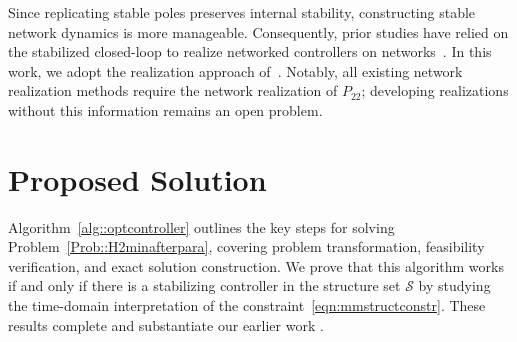 

\begin{rem}
Since replicating stable poles preserves internal stability, constructing stable network dynamics is more manageable. Consequently, prior studies have relied on the stabilized closed-loop to realize networked controllers on networks~\cite{wang2019SLS, Gulnihal2018thesis, Rantzer2019Netimpl}. In this work, we adopt the realization approach of~\cite{Gulnihal2018thesis}. Notably, all existing network realization methods require the network realization of \(P_{22}\); developing realizations without this information remains an open problem.
\end{rem}


\section{Proposed Solution}\label{sec:Mainresult}


Algorithm~\ref{alg::optcontroller} outlines the key steps for solving Problem~\ref{Prob::H2minafterpara}, covering problem transformation, feasibility verification, and exact solution construction. We prove that this algorithm works if and only if there is a stabilizing controller in the structure set \(\mathcal{S}\) by studying the time-domain interpretation of the constraint~\eqref{eqn:mmstructconstr}.
These results complete and substantiate our earlier work \cite{Yuanji2024disH2, Yuanji2024spar}. 

